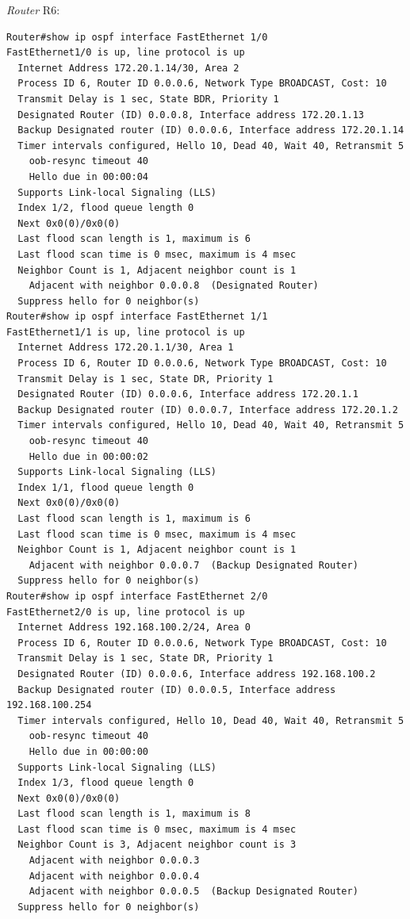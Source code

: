 \emph{Router} \textsf{R6}:
\begin{verbatim}
Router#show ip ospf interface FastEthernet 1/0
FastEthernet1/0 is up, line protocol is up 
  Internet Address 172.20.1.14/30, Area 2 
  Process ID 6, Router ID 0.0.0.6, Network Type BROADCAST, Cost: 10
  Transmit Delay is 1 sec, State BDR, Priority 1 
  Designated Router (ID) 0.0.0.8, Interface address 172.20.1.13
  Backup Designated router (ID) 0.0.0.6, Interface address 172.20.1.14
  Timer intervals configured, Hello 10, Dead 40, Wait 40, Retransmit 5
    oob-resync timeout 40
    Hello due in 00:00:04
  Supports Link-local Signaling (LLS)
  Index 1/2, flood queue length 0
  Next 0x0(0)/0x0(0)
  Last flood scan length is 1, maximum is 6
  Last flood scan time is 0 msec, maximum is 4 msec
  Neighbor Count is 1, Adjacent neighbor count is 1 
    Adjacent with neighbor 0.0.0.8  (Designated Router)
  Suppress hello for 0 neighbor(s)
Router#show ip ospf interface FastEthernet 1/1
FastEthernet1/1 is up, line protocol is up 
  Internet Address 172.20.1.1/30, Area 1 
  Process ID 6, Router ID 0.0.0.6, Network Type BROADCAST, Cost: 10
  Transmit Delay is 1 sec, State DR, Priority 1 
  Designated Router (ID) 0.0.0.6, Interface address 172.20.1.1
  Backup Designated router (ID) 0.0.0.7, Interface address 172.20.1.2
  Timer intervals configured, Hello 10, Dead 40, Wait 40, Retransmit 5
    oob-resync timeout 40
    Hello due in 00:00:02
  Supports Link-local Signaling (LLS)
  Index 1/1, flood queue length 0
  Next 0x0(0)/0x0(0)
  Last flood scan length is 1, maximum is 6
  Last flood scan time is 0 msec, maximum is 4 msec
  Neighbor Count is 1, Adjacent neighbor count is 1 
    Adjacent with neighbor 0.0.0.7  (Backup Designated Router)
  Suppress hello for 0 neighbor(s)
Router#show ip ospf interface FastEthernet 2/0
FastEthernet2/0 is up, line protocol is up 
  Internet Address 192.168.100.2/24, Area 0 
  Process ID 6, Router ID 0.0.0.6, Network Type BROADCAST, Cost: 10
  Transmit Delay is 1 sec, State DR, Priority 1 
  Designated Router (ID) 0.0.0.6, Interface address 192.168.100.2
  Backup Designated router (ID) 0.0.0.5, Interface address 192.168.100.254
  Timer intervals configured, Hello 10, Dead 40, Wait 40, Retransmit 5
    oob-resync timeout 40
    Hello due in 00:00:00
  Supports Link-local Signaling (LLS)
  Index 1/3, flood queue length 0
  Next 0x0(0)/0x0(0)
  Last flood scan length is 1, maximum is 8
  Last flood scan time is 0 msec, maximum is 4 msec
  Neighbor Count is 3, Adjacent neighbor count is 3 
    Adjacent with neighbor 0.0.0.3
    Adjacent with neighbor 0.0.0.4
    Adjacent with neighbor 0.0.0.5  (Backup Designated Router)
  Suppress hello for 0 neighbor(s)
\end{verbatim}

